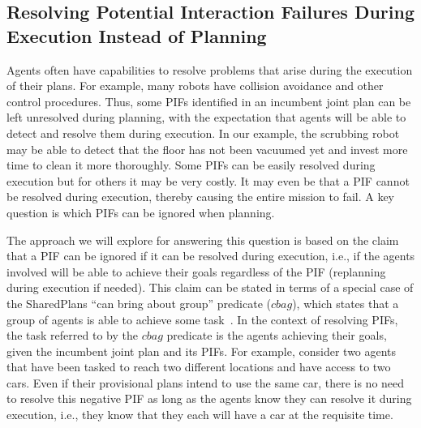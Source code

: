 \documentclass[11pt]{article}
\begin{document}
\subsection{Resolving Potential Interaction Failures During Execution Instead of Planning}
\label{sec:resolving}

Agents often have capabilities to resolve problems that arise during the execution of their plans. For example, many robots have collision avoidance and other control procedures. 
Thus, some PIFs identified in an incumbent joint plan can be left unresolved during planning, with the expectation that agents will be able to detect and resolve them during execution. In our example, the  scrubbing robot may be able to detect that the floor has not been vacuumed yet and invest more time to clean it more thoroughly. %
Some PIFs can be easily resolved during execution but for others it may be very costly. It may even be that a PIF cannot be resolved during execution, thereby causing the entire mission to fail. A key question is which PIFs can be ignored when planning. 




The approach we will explore for answering this question is based on the claim that a PIF can be ignored if it can be resolved during execution, i.e., if the agents involved will be able to achieve their goals regardless of the PIF (replanning during execution if needed). This claim can be stated in terms of a  special case of the SharedPlans ``can bring about group'' predicate ($cbag$), which states that a group of agents is able to achieve some task~\cite{grosz1996collaborative}. In the context of resolving PIFs, the task referred to by the $cbag$ predicate is the agents achieving their goals, given the incumbent joint plan and its PIFs.  
For example, consider two agents that have been tasked to reach two different locations and have access to two cars. Even if their provisional plans intend to use the same car, there is no need to resolve this negative PIF as long as the agents know they can resolve it during execution, i.e., they know that they each will have a car at the requisite time. 
\end{document}
